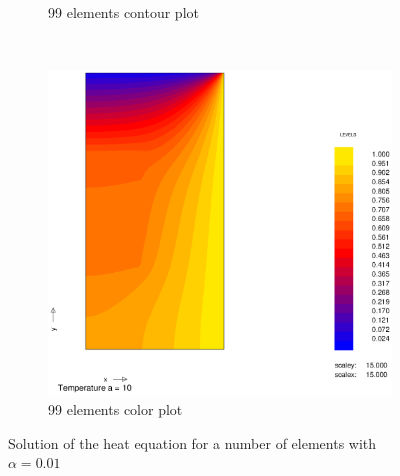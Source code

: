 \documentclass[10pt,a4paper]{article}
\begin{document}
\begin{figure}[h]
\begin{subfigure}[b]{0.45\textwidth}
                \caption{99 elements contour plot}
                \label{fig:cont_a10_99el}
        \end{subfigure}
        ~ 
        \begin{subfigure}[b]{0.45\textwidth}
                \includegraphics[width=\textwidth]{colplot_a10_99el}
                \caption{99 elements color plot}
                \label{fig:colplot_a10_99el}
        \end{subfigure}
        \caption{Solution of the heat equation for a number of elements with $\alpha = 0.01$} 
        \label{fig:001}                                
\end{figure}
\newpage
\end{document}

